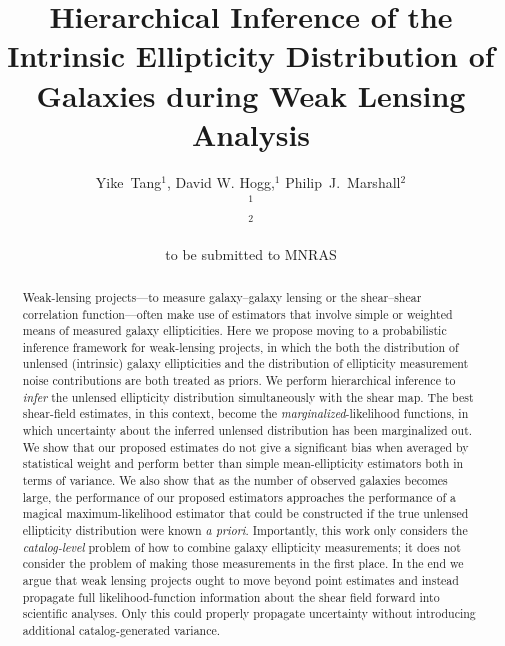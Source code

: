 \documentclass[useAMS,usenatbib]{mn2e}
\title[Hierarchical Inference in Weak Lensing]
{Hierarchical Inference of the Intrinsic Ellipticity
Distribution of Galaxies during Weak Lensing Analysis}
\author[Tang et al]{%
  Yike~Tang$^{1}$,
  David W. Hogg,$^{1}$
  Philip~J.~Marshall$^{2}$
  \medskip\\
  $^1$\nyu\\
  $^2$\oxford
}
\begin{document}
             
\date{to be submitted to MNRAS}
             
\pagerange{\pageref{firstpage}--\pageref{lastpage}}

\maketitle           

\label{firstpage}


\begin{abstract}
Weak-lensing projects---to measure galaxy--galaxy lensing or the shear--shear
correlation function---often make use of estimators that involve simple or weighted
means of measured galaxy ellipticities.  Here we propose moving to a probabilistic inference
framework for weak-lensing projects, in which the both the distribution of unlensed
(intrinsic) galaxy ellipticities and the distribution of ellipticity measurement noise contributions
are both treated as priors.  We perform hierarchical inference to \emph{infer} the
unlensed ellipticity distribution simultaneously with the shear map.  The best
shear-field estimates, in this context, become the \emph{marginalized}-likelihood functions, in which uncertainty about the
inferred unlensed distribution has been marginalized out.  We show that our proposed
estimates do not give a significant bias when averaged by statistical weight and perform better than simple mean-ellipticity estimators both in terms of variance.
We also show that as the number of observed galaxies becomes
large, the performance of our proposed estimators approaches the performance of a
magical maximum-likelihood estimator that could be constructed if the true unlensed
ellipticity distribution were known \textit{a priori}.  Importantly, this work only
considers the \emph{catalog-level} problem of how to combine galaxy ellipticity
measurements; it does not consider the problem of making those measurements in the
first place.  In the end we argue that weak lensing projects ought to move beyond
point estimates and instead propagate full likelihood-function information about
the shear field forward into scientific analyses. Only this could properly
propagate uncertainty without introducing additional catalog-generated variance.
\end{abstract}

\end{document}
